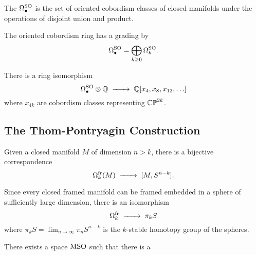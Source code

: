\begin{definition}
	The  $\Omega^{\mathrm{SO}}_\bullet$ is the set of oriented cobordism classes of closed manifolds under the operations of disjoint union and product.
\end{definition}

The oriented cobordism ring has a grading by
\[
	\Omega_\bullet^{\mathrm{SO}} = \bigoplus_{k\geq 0} \Omega^{\mathrm{SO}}_k.
\]

\begin{theorem}\label{thm:oriented-cobordism-structure}
	There is a ring isomorphism
	\[
		\Omega_\bullet^\SO \otimes \Q \lkxto \Q[x_4, x_8, x_{12}, \ldots]
	\]
	where $x_{4k}$ are cobordism classes representing $\mathbb{CP}^{2k}$.
\end{theorem}

\subsection{The Thom-Pontryagin Construction}

\begin{theorem}
	Given a closed manifold $M$ of dimension $n>k$, there is a bijective correspondence
	\begin{equation}
		\Omega^\fr_k(M) \lkxto[] [M, S^{n-k}].
	\end{equation}
\end{theorem}

\begin{corollary}
	Since every closed framed manifold can be framed embedded in a sphere of sufficiently large dimension, there is an isomorphism
	\begin{equation}
		\Omega^\fr_k \lkxto \pi_k S
	\end{equation}
	where $\pi_k S = \lim_{n\to\infty} \pi_n S^{n-k}$ is the $k$-stable homotopy group of the spheres.
\end{corollary}

\begin{theorem}
	There exists a space $\mathrm{MSO}$ such that there is a
\end{theorem}
